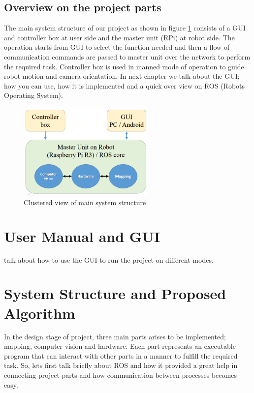 \documentclass[12pt]{article}
\begin{document}
\subsection{Overview on the project parts}
The main system structure of our project as shown in figure \ref{fig:system-structure} consists of a GUI and controller box at user side and the master unit (RPi) at robot side. The operation starts from GUI to select the function needed and then a flow of communication commands are passed to master unit over the network to perform the required task. Controller box is used in manned mode of operation to guide robot motion and camera orientation. In next chapter we talk about the GUI; how you can use, how it is implemented and a quick over view on ROS (Robots Operating System).
\begin{figure}[H]
	\centering
	\includegraphics[width =0.6\textwidth]{Fig/overview.png}
	\caption{Clustered view of main system structure}
	\label{fig:system-structure}
\end{figure}
\newpage

\section{User Manual and GUI}
talk about how to use the GUI to run the project on different modes.

\newpage

\section{System Structure and Proposed Algorithm}
In the design stage of project, three main parts arises to be implemented; mapping, computer vision and hardware. Each part represents an executable program that can interact with other parts in a manner to fulfill the required task. So, lets first talk briefly about ROS and how it provided a great help in connecting project parts and how communication between processes becomes easy.
\end{document}

